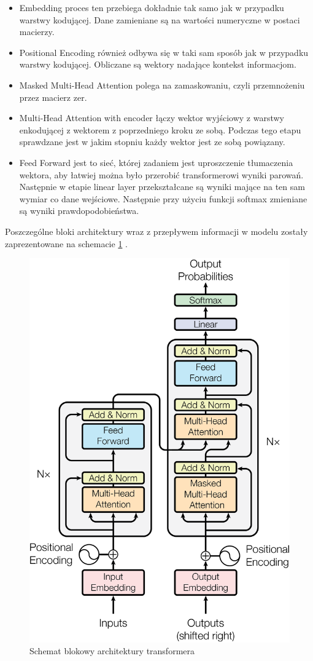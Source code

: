 \documentclass[12pt,a4paper,twoside]{book} %
\begin{document}
\begin{itemize}
    \item Embedding proces ten przebiega dokładnie tak samo jak w przypadku warstwy kodującej. Dane zamieniane są na wartości numeryczne w postaci macierzy.
    \item Positional Encoding również odbywa się w taki sam sposób jak w przypadku warstwy kodującej. Obliczane są wektory nadające kontekst informacjom.
    \item Masked Multi-Head Attention polega na zamaskowaniu, czyli przemnożeniu przez macierz zer.
    \item Multi-Head Attention with encoder łączy wektor wyjściowy z warstwy enkodującej z wektorem z poprzedniego kroku ze sobą. Podczas tego etapu sprawdzane jest w jakim stopniu każdy wektor jest ze sobą powiązany.
    \item Feed Forward jest to sieć, której zadaniem jest uproszczenie tłumaczenia wektora, aby łatwiej można było przerobić transformerowi wyniki parowań. Następnie w etapie linear layer przekształcane są wyniki mające na ten sam wymiar co dane wejściowe. Następnie przy użyciu funkcji softmax zmieniane są wyniki prawdopodobieństwa.
\end{itemize}

Poszczególne bloki architektury wraz z przepływem informacji w modelu zostały zaprezentowane na schemacie \ref{fig:transformer_architecture} \cite{vaswani2023attentionneed}.

\begin{figure}[h]
    \centering
	\includegraphics[scale=0.20]{figs/architecture.png}
	\caption{Schemat blokowy architektury transformera}
	\label{fig:transformer_architecture}
\end{figure}



\end{document}
